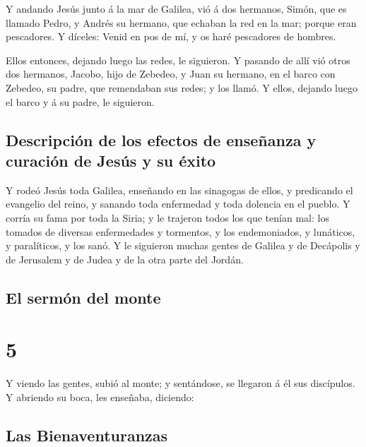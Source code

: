  Y andando Jesús junto á la mar de Galilea, vió á dos
hermanos, Simón, que es llamado Pedro, y Andrés su hermano, que echaban
la red en la mar; porque eran pescadores.  Y díceles:
Venid en pos de mí, y os haré pescadores de hombres.

 Ellos entonces, dejando luego las redes, le siguieron.
 Y pasando de allí vió otros dos hermanos, Jacobo, hijo
de Zebedeo, y Juan su hermano, en el barco con Zebedeo, su padre, que
remendaban sus redes; y los llamó.  Y ellos, dejando
luego el barco y á su padre, le siguieron.

\hypertarget{descripciuxf3n-de-los-efectos-de-enseuxf1anza-y-curaciuxf3n-de-jesuxfas-y-su-uxe9xito}{%
\subsection{Descripción de los efectos de enseñanza y curación de Jesús
y su
éxito}\label{descripciuxf3n-de-los-efectos-de-enseuxf1anza-y-curaciuxf3n-de-jesuxfas-y-su-uxe9xito}}

 Y rodeó Jesús toda Galilea, enseñando en las sinagogas
de ellos, y predicando el evangelio del reino, y sanando toda enfermedad
y toda dolencia en el pueblo.  Y corría su fama por toda
la Siria; y le trajeron todos los que tenían mal: los tomados de
diversas enfermedades y tormentos, y los endemoniados, y lunáticos, y
paralíticos, y los sanó.  Y le siguieron muchas gentes de
Galilea y de Decápolis y de Jerusalem y de Judea y de la otra parte del
Jordán.

\hypertarget{el-sermuxf3n-del-monte}{%
\subsection{El sermón del monte}\label{el-sermuxf3n-del-monte}}

\hypertarget{section-4}{%
\section{5}\label{section-4}}

 Y viendo las gentes, subió al monte; y sentándose, se
llegaron á él sus discípulos.  Y abriendo su boca, les
enseñaba, diciendo:

\hypertarget{las-bienaventuranzas}{%
\subsection{Las Bienaventuranzas}\label{las-bienaventuranzas}}


